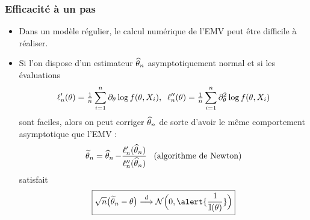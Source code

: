 \begin{frame}
\frametitle{Efficacité à un pas}
\begin{itemize}
\item Dans un modèle régulier, le \alert{calcul numérique} de l'EMV peut être difficile à réaliser.
\item Si l'on dispose d'un estimateur $\operatorname{\widehat \theta_{\mathnormal{n}}}$ \alert{asymptotiquement normal} et si les évaluations
$$\ell'_n(\theta) = \tfrac{1}{n}\sum_{i = 1}^n \partial_\theta \log f(\theta, X_i),\;\;\ell''_n(\theta)=\tfrac{1}{n}\sum_{i = 1}^n\partial_\theta^2 \log f(\theta, X_i)$$
sont \alert{faciles}, alors on peut \alert{ corriger} $\operatorname{\widehat \theta_{\mathnormal{n}}}$ de sorte d'avoir le même comportement asymptotique que l'EMV :
$$\widetilde {\theta}_n = \operatorname{\widehat \theta_{\mathnormal{n}}} - \frac{\ell'_n(\operatorname{\widehat \theta_{\mathnormal{n}}})}{\ell''_n(\operatorname{\widehat \theta_{\mathnormal{n}}})}\;\;\;\text{(algorithme de Newton)}$$
satisfait
$$\boxed{\sqrt{n}\big(\widetilde \truetheta_n-\truetheta\big) \stackrel{d}{\longrightarrow} {\mathcal N}\Big(0, \alert{\frac{1}{\mathbb{I}(\truetheta)}}\Big)}$$
\end{itemize}
\end{frame}
















